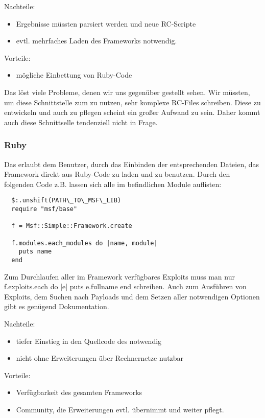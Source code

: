 Nachteile:
\begin{itemize}
  \item Ergebnisse müssten parsiert werden und neue RC-Scripte 
  \item evtl. mehrfaches Laden des Frameworks notwendig. 
\end{itemize}

Vorteile: 
\begin{itemize}
  \item mögliche Einbettung von Ruby-Code
\end{itemize}

Das  löst viele Probleme, denen wir uns gegenüber gestellt
sehen. Wir müssten, um diese Schnittstelle zum  zu nutzen,
sehr komplexe RC-Files schreiben. Diese zu entwickeln und auch zu
pflegen scheint ein großer Aufwand zu sein. Daher kommt auch diese
Schnittselle tendenziell nicht in Frage.

\subsubsection{Ruby}

Das  erlaubt dem Benutzer, durch das Einbinden der
entsprechenden Dateien, das Framework direkt aus Ruby-Code zu laden
und zu benutzen. 
Durch den folgenden Code z.B. lassen sich alle im  befindlichen
Module auflisten:

\begin{verbatim}
  $:.unshift(PATH\_TO\_MSF\_LIB)
  require "msf/base"

  f = Msf::Simple::Framework.create

  f.modules.each_modules do |name, module|
    puts name
  end
\end{verbatim}

Zum Durchlaufen aller im Framework verfügbares Exploits muss man nur
f.exploits.each do |e| puts e.fullname end schreiben. 
Auch zum Ausführen von Exploits, dem Suchen nach Payloads und dem
Setzen aller notwendigen Optionen gibt es genügend Dokumentation.

Nachteile:
\begin{itemize}
  \item tiefer Einstieg in den Quellcode des  notwendig
  \item nicht ohne Erweiterungen über Rechnernetze nutzbar
\end{itemize}

Vorteile: 
\begin{itemize}
  \item Verfügbarkeit des gesamten Frameworks
  \item Community, die Erweiterungen evtl. übernimmt und weiter pflegt.
\end{itemize}

